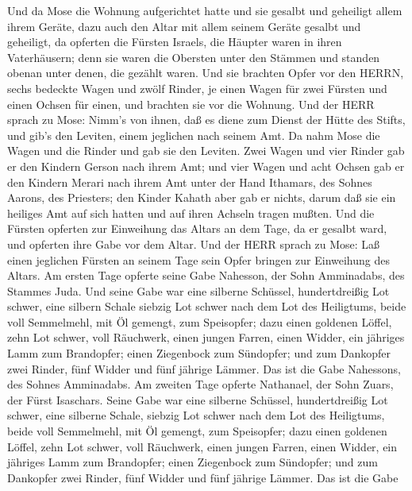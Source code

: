  Und da Mose die Wohnung aufgerichtet hatte und sie gesalbt
und geheiligt allem ihrem Geräte, dazu auch den Altar mit allem seinem
Geräte gesalbt und geheiligt,  da opferten die Fürsten
Israels, die Häupter waren in ihren Vaterhäusern; denn sie waren die
Obersten unter den Stämmen und standen obenan unter denen, die gezählt
waren.  Und sie brachten Opfer vor den HERRN, sechs bedeckte
Wagen und zwölf Rinder, je einen Wagen für zwei Fürsten und einen Ochsen
für einen, und brachten sie vor die Wohnung.  Und der HERR
sprach zu Mose:  Nimm's von ihnen, daß es diene zum Dienst
der Hütte des Stifts, und gib's den Leviten, einem jeglichen nach seinem
Amt.  Da nahm Mose die Wagen und die Rinder und gab sie den
Leviten.  Zwei Wagen und vier Rinder gab er den Kindern
Gerson nach ihrem Amt;  und vier Wagen und acht Ochsen gab
er den Kindern Merari nach ihrem Amt unter der Hand Ithamars, des Sohnes
Aarons, des Priesters;  den Kinder Kahath aber gab er
nichts, darum daß sie ein heiliges Amt auf sich hatten und auf ihren
Achseln tragen mußten.  Und die Fürsten opferten zur
Einweihung das Altars an dem Tage, da er gesalbt ward, und opferten ihre
Gabe vor dem Altar.  Und der HERR sprach zu Mose: Laß einen
jeglichen Fürsten an seinem Tage sein Opfer bringen zur Einweihung des
Altars.  Am ersten Tage opferte seine Gabe Nahesson, der
Sohn Amminadabs, des Stammes Juda.  Und seine Gabe war eine
silberne Schüssel, hundertdreißig Lot schwer, eine silbern Schale
siebzig Lot schwer nach dem Lot des Heiligtums, beide voll Semmelmehl,
mit Öl gemengt, zum Speisopfer;  dazu einen goldenen
Löffel, zehn Lot schwer, voll Räuchwerk,  einen jungen
Farren, einen Widder, ein jähriges Lamm zum Brandopfer; 
einen Ziegenbock zum Sündopfer;  und zum Dankopfer zwei
Rinder, fünf Widder und fünf jährige Lämmer. Das ist die Gabe Nahessons,
des Sohnes Amminadabs.  Am zweiten Tage opferte Nathanael,
der Sohn Zuars, der Fürst Isaschars.  Seine Gabe war eine
silberne Schüssel, hundertdreißig Lot schwer, eine silberne Schale,
siebzig Lot schwer nach dem Lot des Heiligtums, beide voll Semmelmehl,
mit Öl gemengt, zum Speisopfer;  dazu einen goldenen
Löffel, zehn Lot schwer, voll Räuchwerk,  einen jungen
Farren, einen Widder, ein jähriges Lamm zum Brandopfer; 
einen Ziegenbock zum Sündopfer;  und zum Dankopfer zwei
Rinder, fünf Widder und fünf jährige Lämmer. Das ist die Gabe
